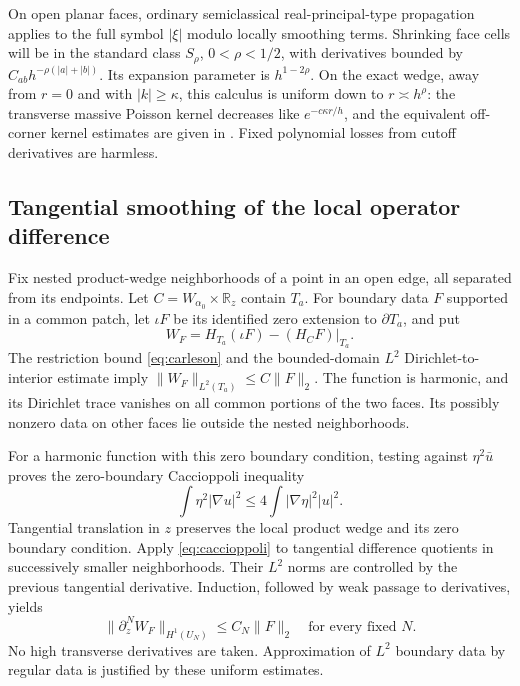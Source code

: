 \documentclass[11pt]{amsart}
\numberwithin{equation}{section}
\theoremstyle{remark}
\newcommand{\R}{\mathbb{R}}
\begin{document}
On open planar faces, ordinary semiclassical real-principal-type propagation applies to the full symbol $|\xi|$ modulo locally smoothing terms. Shrinking face cells will be in the standard class $S_\rho$, $0<\rho<1/2$, with derivatives bounded by $C_{ab}h^{-\rho(|a|+|b|)}$. Its expansion parameter is $h^{1-2\rho}$. On the exact wedge, away from $r=0$ and with $|k|\ge\kappa$, this calculus is uniform down to $r\asymp h^\rho$: the transverse massive Poisson kernel decreases like $e^{-c\kappa r/h}$, and the equivalent off-corner kernel estimates are given in \cite[(2.5)--(2.6)]{I}. Fixed polynomial losses from cutoff derivatives are harmless.

\subsection{Tangential smoothing of the local operator difference}
Fix nested product-wedge neighborhoods of a point in an open edge, all separated from its endpoints. Let $C=W_{\alpha_0}\times\R_z$ contain $T_a$. For boundary data $F$ supported in a common patch, let $\iota F$ be its identified zero extension to $\partial T_a$, and put
\begin{equation}\label{eq:WF}
W_F=H_{T_a}(\iota F)-(H_CF)|_{T_a} .
\end{equation}
The restriction bound \eqref{eq:carleson} and the bounded-domain $L^2$ Dirichlet-to-interior estimate imply $\|W_F\|_{L^2(T_a)}\le C\|F\|_2$. The function is harmonic, and its Dirichlet trace vanishes on all common portions of the two faces. Its possibly nonzero data on other faces lie outside the nested neighborhoods.

For a harmonic function with this zero boundary condition, testing against $\eta^2\bar u$ proves the zero-boundary Caccioppoli inequality
\begin{equation}\label{eq:caccioppoli}
\int\eta^2|\nabla u|^2\le4\int|\nabla\eta|^2|u|^2 .
\end{equation}
Tangential translation in $z$ preserves the local product wedge and its zero boundary condition. Apply \eqref{eq:caccioppoli} to tangential difference quotients in successively smaller neighborhoods. Their $L^2$ norms are controlled by the previous tangential derivative. Induction, followed by weak passage to derivatives, yields
\begin{equation}\label{eq:tangentialreg}
\|\partial_z^NW_F\|_{H^1(U_N)}\le C_N\|F\|_2\quad\text{for every fixed }N .
\end{equation}
No high transverse derivatives are taken. Approximation of $L^2$ boundary data by regular data is justified by these uniform estimates.
\end{document}
